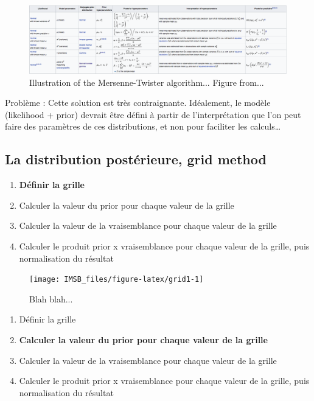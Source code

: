 \documentclass[
  a4paper,11pt,twoside,onecolumn,openright,final,oldfontcommands]{memoir}
\providecommand{\tightlist}{%
  \setlength{\itemsep}{0pt}\setlength{\parskip}{0pt}}
\theoremstyle{definition}
\theoremstyle{definition}
\theoremstyle{definition}
\theoremstyle{definition}
\theoremstyle{remark}
\begin{document}
\begin{figure}[!htb]

{\centering \includegraphics[width=1\linewidth]{figures/continuous} 

}

\caption{Illustration of the Mersenne-Twister algorithm... Figure from...}\label{fig:continuous}
\end{figure}

Problème : Cette solution est très contraignante. Idéalement, le modèle (likelihood + prior) devrait être défini à partir de l'interprétation que l'on peut faire des paramètres de ces distributions, et non pour faciliter les calculs\ldots{}

\hypertarget{la-distribution-postuxe9rieure-grid-method}{%
\subsection{La distribution postérieure, grid method}\label{la-distribution-postuxe9rieure-grid-method}}

\begin{enumerate}
\def\labelenumi{\arabic{enumi}.}
\tightlist
\item
  \textbf{Définir la grille}
\item
  Calculer la valeur du prior pour chaque valeur de la grille
\item
  Calculer la valeur de la vraisemblance pour chaque valeur de la grille
\item
  Calculer le produit prior x vraisemblance pour chaque valeur de la grille, puis normalisation du résultat
\end{enumerate}

\begin{figure}[!htb]

{\centering \texttt{[image: IMSB\_files/figure-latex/grid1-1]} 

}

\caption{Blah blah...}\label{fig:grid1}
\end{figure}

\begin{enumerate}
\def\labelenumi{\arabic{enumi}.}
\tightlist
\item
  Définir la grille
\item
  \textbf{Calculer la valeur du prior pour chaque valeur de la grille}
\item
  Calculer la valeur de la vraisemblance pour chaque valeur de la grille
\item
  Calculer le produit prior x vraisemblance pour chaque valeur de la grille, puis normalisation du résultat
\end{enumerate}
\end{document}
